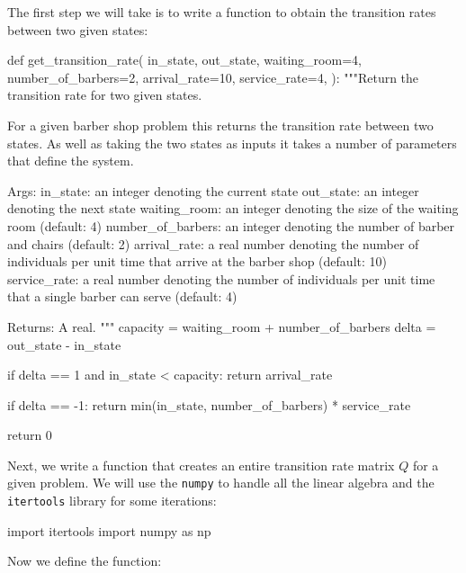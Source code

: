 The first step we will take is to write a function to obtain the transition
rates between two given states:


\begin{pyin}
def get_transition_rate(
    in_state,
    out_state,
    waiting_room=4,
    number_of_barbers=2,
    arrival_rate=10,
    service_rate=4,
):
    """Return the transition rate for two given states.

    For a given barber shop problem this returns the
    transition rate between two states. As well as taking
    the two states as inputs it takes a number of parameters
    that define the system.

    Args:
        in_state: an integer denoting the current state
        out_state: an integer denoting the next state
        waiting_room: an integer denoting the size of the
                      waiting room (default: 4)
        number_of_barbers: an integer denoting the number of
                           barber and chairs (default: 2)
        arrival_rate: a real number denoting the number of
                      individuals per unit time that arrive at
                      the barber shop (default: 10)
        service_rate: a real number denoting the number of
                      individuals per unit time that a single
                      barber can serve (default: 4)

    Returns:
        A real.
    """
    capacity = waiting_room + number_of_barbers
    delta = out_state - in_state

    if delta == 1 and in_state < capacity:
        return arrival_rate

    if delta == -1:
        return min(in_state, number_of_barbers) * service_rate

    return 0
\end{pyin}

Next, we write a function that creates an entire transition rate matrix \(Q\)
for a given problem. We will use the \texttt{numpy} to handle all
the linear algebra and the \texttt{itertools} library for some
iterations:

\begin{pyin}
import itertools
import numpy as np
\end{pyin}

Now we define the function:

